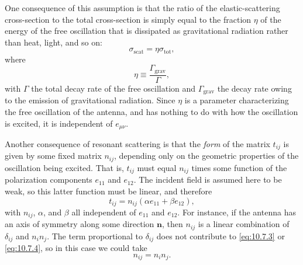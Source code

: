 One consequence of this assumption is that the ratio of the elastic-scattering
cross-section to the total cross-section is simply equal to the fraction
\(\eta\) of the energy of the free oscillation that is dissipated as
gravitational radiation rather than heat, light, and so on:
\begin{equation}
  \sigma_{\mathrm{scat}}=\eta\sigma_{\mathrm{tot}},
  \tag{10.7.5}\label{eq:10.7.5}
\end{equation}
where
\[
  \eta\equiv\frac{\Gamma_{\mathrm{grav}}}{\Gamma},
\]
with \(\Gamma\) the total decay rate of the free oscillation and
\(\Gamma_{\mathrm{grav}}\) the decay rate owing to the emission of gravitational
radiation. Since \(\eta\) is a parameter characterizing the free oscillation of
the antenna, and has nothing to do with how the oscillation is excited, it is
independent of \(e_{\mu\nu}\).

Another consequence of resonant scattering is that the \emph{form} of the
matrix \(t_{ij}\) is given by some fixed matrix \(n_{ij}\), depending only on
the geometric properties of the oscillation being excited. That is,
\(t_{ij}\) must equal \(n_{ij}\) times some function of the polarization
components \(e_{11}\) and \(e_{12}\). The incident field is assumed here to be
weak, so this latter function must be linear, and therefore
\begin{equation}
  t_{ij}=n_{ij}(\alpha e_{11}+\beta e_{12}),
  \tag{10.7.6}\label{eq:10.7.6}
\end{equation}
with \(n_{ij}\), \(\alpha\), and \(\beta\) all independent of \(e_{11}\) and
\(e_{12}\). For instance, if the antenna has an axis of symmetry along some
direction \(\mathbf{n}\), then \(n_{ij}\) is a linear combination of
\(\delta_{ij}\) and \(n_i n_j\). The term proportional to \(\delta_{ij}\)
does not contribute to \eqref{eq:10.7.3} or \eqref{eq:10.7.4}, so in this
case we could take
\begin{equation}
  n_{ij}=n_i n_j.
  \tag{10.7.7}\label{eq:10.7.7}
\end{equation}

